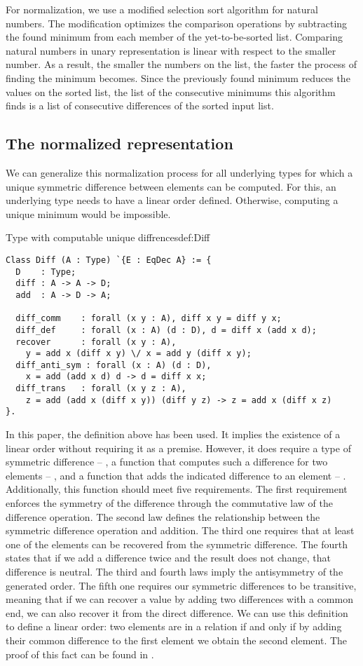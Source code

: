 For normalization, we use a modified selection sort algorithm for natural numbers. The modification optimizes the comparison operations by subtracting the found minimum from each member of the yet-to-be-sorted list. Comparing natural numbers in unary representation is linear with respect to the smaller number. As a result, the smaller the numbers on the list, the faster the process of finding the minimum becomes. Since the previously found minimum reduces the values on the sorted list, the list of the consecutive minimums this algorithm finds is a list of consecutive differences of the sorted input list.
\subsection{The normalized representation}
We can generalize this normalization process for all underlying types for which a unique symmetric difference between elements can be computed. For this, an underlying type needs to have a linear order defined. Otherwise, computing a unique minimum would be impossible.
\begin{defi}{Type with computable unique diffrences}{def:Diff}
\begin{verbatim}
Class Diff (A : Type) `{E : EqDec A} := {
  D    : Type;
  diff : A -> A -> D;
  add  : A -> D -> A;

  diff_comm    : forall (x y : A), diff x y = diff y x;
  diff_def     : forall (x : A) (d : D), d = diff x (add x d);
  recover      : forall (x y : A), 
    y = add x (diff x y) \/ x = add y (diff x y);
  diff_anti_sym : forall (x : A) (d : D), 
    x = add (add x d) d -> d = diff x x;
  diff_trans   : forall (x y z : A), 
    z = add (add x (diff x y)) (diff y z) -> z = add x (diff x z)
}.
\end{verbatim}
\end{defi}
In this paper, the definition above has been used. It implies the existence of a linear order without requiring it as a premise. However, it does require a type of symmetric difference -- , a function that computes such a difference for two elements -- , and a function that adds the indicated difference to an element -- . Additionally, this function should meet five requirements. The first requirement enforces the symmetry of the difference through the commutative law of the difference operation. The second law defines the relationship between the symmetric difference operation and addition. The third one requires that at least one of the elements can be recovered from the symmetric difference. The fourth states that if we add a difference twice and the result does not change, that difference is neutral. The third and fourth laws imply the antisymmetry of the generated order. The fifth one requires our symmetric differences to be transitive, meaning that if we can recover a value by adding two differences with a common end, we can also recover it from the direct difference. We can use this definition to define a linear order: two elements are in a relation if and only if by adding their common difference to the first element we obtain the second element. The proof of this fact can be found in .

